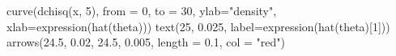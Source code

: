 \begin{Schunk}
\begin{Sinput}
 curve(dchisq(x, 5), from = 0, to = 30, ylab="density", xlab=expression(hat(theta)))
 text(25, 0.025, label=expression(hat(theta)[1]))
 arrows(24.5, 0.02, 24.5, 0.005, length = 0.1, col = "red")
\end{Sinput}
\end{Schunk}
